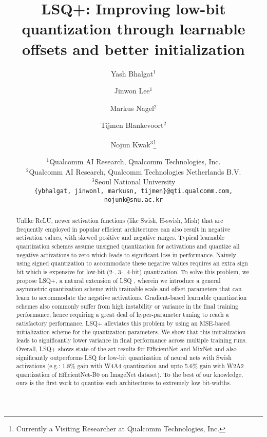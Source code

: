 \documentclass[10pt,twocolumn,letterpaper]{article}
\begin{document}
\title{LSQ+: Improving low-bit quantization through learnable offsets and better initialization}

\author{Yash Bhalgat$^1$\\
\and
Jinwon Lee$^1$\\
\and
Markus Nagel$^2$\\
\and
Tijmen Blankevoort$^2$\\
\and
Nojun Kwak$^3$\thanks{Currently a Visiting Researcher at Qualcomm Technologies, Inc.}\\
\and
$^1$Qualcomm AI Research, Qualcomm Technologies, Inc.\\
$^2$Qualcomm AI Research, Qualcomm Technologies Netherlands B.V.\\
$^3$Seoul National University\\
{\tt\small \{ybhalgat, jinwonl, markusn, tijmen\}@qti.qualcomm.com,  nojunk@snu.ac.kr}\\
}



\maketitle
\thispagestyle{empty}

\begin{abstract}
  Unlike ReLU, newer activation functions (like Swish, H-swish, Mish) that are frequently employed in popular efficient architectures can also result in negative activation values, with skewed positive and negative ranges. Typical learnable quantization schemes \cite{pact2018, lsq} assume unsigned quantization for activations and quantize all negative activations to zero which leads to significant loss in performance. Naively using signed quantization to accommodate these negative values requires an extra sign bit which is expensive for low-bit (2-, 3-, 4-bit) quantization. To solve this problem, we propose LSQ+, a natural extension of LSQ \cite{lsq}, wherein we introduce a general asymmetric quantization scheme with trainable scale and offset parameters that can learn to accommodate the negative activations. Gradient-based learnable quantization schemes also commonly suffer from high instability or variance in the final training performance, hence requiring a great deal of hyper-parameter tuning to reach a satisfactory performance. LSQ+ alleviates this problem by using an MSE-based initialization scheme for the quantization parameters. We show that this initialization leads to significantly lower variance in final performance across multiple training runs. Overall, LSQ+ shows state-of-the-art results for EfficientNet and MixNet and also significantly outperforms LSQ for low-bit quantization of neural nets with Swish activations (e.g.: 1.8\% gain with W4A4 quantization and upto 5.6\% gain with W2A2 quantization of EfficientNet-B0 on ImageNet dataset). To the best of our knowledge, ours is the first work to quantize such architectures to extremely low bit-widths. 


\end{abstract}
\end{document}
